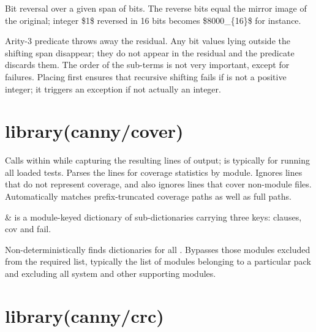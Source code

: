 \begin{description}
Bit reversal over a given span of bits. The reverse bits equal the
mirror image of the original; integer \$1\$ reversed in 16 bits
becomes \$8000_\{16\}\$ for instance.

Arity-3  predicate throws away the residual. Any bit values
lying outside the shifting span disappear; they do not appear in the
residual and the predicate discards them. The order of the sub-terms
is not very important, except for failures. Placing  first
ensures that recursive shifting fails if  is not a positive
integer; it triggers an exception if not actually an integer.
\end{description}

\chapter{library(canny/cover)}\label{sec:cover}

\begin{description}
Calls  within  while capturing the resulting
lines of output;  is typically  for running all
loaded tests. Parses the lines for coverage statistics by module.
Ignores lines that do not represent coverage, and also ignores lines
that cover non-module files. Automatically matches prefix-truncated
coverage paths as well as full paths.

\begin{arguments}
 & is a module-keyed dictionary of sub-dictionaries
carrying three keys: clauses, cov and fail. \\
\end{arguments}

Non-deterministically finds  dictionaries for all .
Bypasses those modules excluded from the required list, typically
the list of modules belonging to a particular pack and excluding all
system and other supporting modules.
\end{description}

\chapter{library(canny/crc)}\label{sec:crc}

